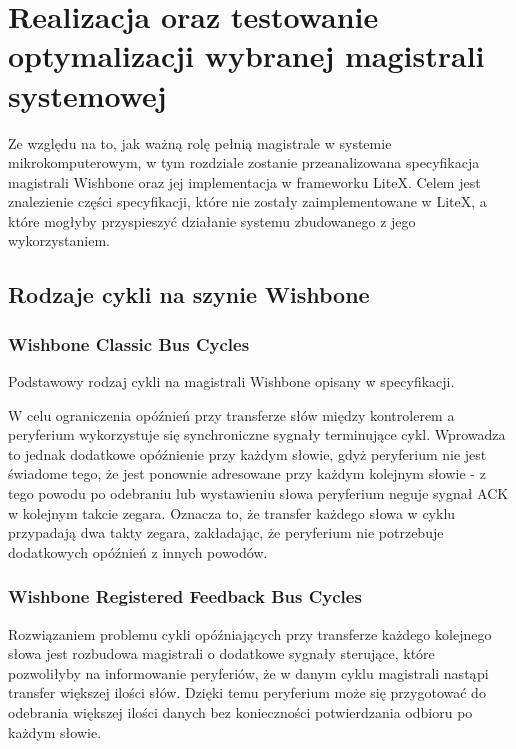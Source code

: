 \section{Realizacja oraz testowanie optymalizacji wybranej magistrali systemowej}
Ze względu na to, jak ważną rolę pełnią magistrale w systemie mikrokomputerowym, w tym rozdziale zostanie przeanalizowana specyfikacja magistrali Wishbone oraz jej implementacja w frameworku LiteX. Celem jest znalezienie części specyfikacji, które nie zostały zaimplementowane w LiteX, a które mogłyby przyspieszyć działanie systemu zbudowanego z jego wykorzystaniem.



\subsection{Rodzaje cykli na szynie Wishbone}

\subsubsection{Wishbone Classic Bus Cycles}
Podstawowy rodzaj cykli na magistrali Wishbone opisany w specyfikacji.


W celu ograniczenia opóźnień przy transferze słów między kontrolerem a peryferium wykorzystuje się synchroniczne sygnały terminujące cykl. Wprowadza to jednak dodatkowe opóźnienie przy każdym słowie, gdyż peryferium nie jest świadome tego, że jest ponownie adresowane przy każdym kolejnym słowie - z tego powodu po odebraniu lub wystawieniu słowa peryferium neguje sygnał ACK w kolejnym takcie zegara. Oznacza to, że transfer każdego słowa w cyklu przypadają dwa takty zegara, zakładając, że peryferium nie potrzebuje dodatkowych opóźnień z innych powodów.

\subsubsection{Wishbone Registered Feedback Bus Cycles}

Rozwiązaniem problemu cykli opóźniających przy transferze każdego kolejnego słowa jest rozbudowa magistrali o dodatkowe sygnały sterujące, które pozwoliłyby na informowanie peryferiów, że w danym cyklu magistrali nastąpi transfer większej ilości słów. Dzięki temu peryferium może się przygotować do odebrania większej ilości danych bez konieczności potwierdzania odbioru po każdym słowie.

